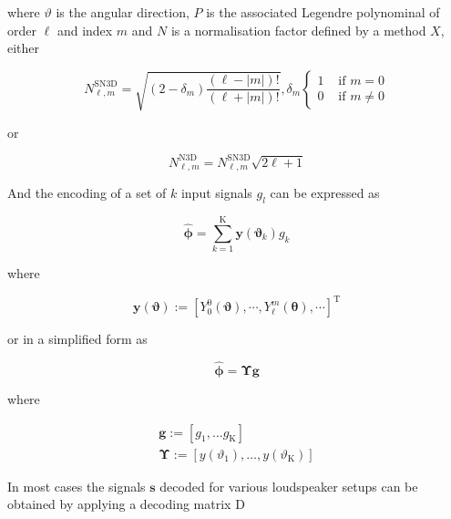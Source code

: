 \documentclass[a4paper, 10pt, twocolumn]{article}
\begin{document}
where $\vartheta$ is the angular direction, $P$ is the associated Legendre polynominal of order $\ell$ and index $m$ and $N$ is a normalisation factor defined by a method $X$, either

\begin{equation}\label{eq:sn3d}
N_{\ell, m}^{\mathrm{SN3D}}=\sqrt{\left(2-\delta_{m}\right) \frac{(\ell-|m|) !}{(\ell+|m|) !}}, \delta_{m}\left\{\begin{array}{ll}{1} & {\text { if } m=0} \\ {0} & {\text { if } m \neq 0}\end{array}\right.
\end{equation}

or 

\begin{equation}\label{eq:n3d}
N_{\ell, m}^{\mathrm{N3D}}=N_{\ell, m}^{\mathrm{SN3D}} \sqrt{2 \ell+1}
\end{equation}

And the encoding of a set of $k$ input signals $g_{l}$ can be expressed as

\begin{equation}
\hat{\boldsymbol{\phi}}=\sum_{k=1}^{\mathrm{K}} \boldsymbol{y}\left(\boldsymbol{\vartheta}_{k}\right) g_{k}
\end{equation}

where


\begin{equation*}
\boldsymbol{y}(\boldsymbol{\vartheta}) :=\left[Y_{0}^{0}(\boldsymbol{\vartheta}), \cdots, Y_{\ell}^{m}(\boldsymbol{\theta}), \cdots\right]^{\mathrm{T}}
\end{equation*}

or in a simplified form as

\begin{equation}
\hat{\boldsymbol{\phi}}=\boldsymbol{\Upsilon} \boldsymbol{g}
\end{equation}

where

\begin{equation*}
\begin{array}{l}{\boldsymbol{g} :=\left[g_{1}, \ldots g_{\mathrm{K}}\right]} \\ {\boldsymbol{\Upsilon} :=\left[y\left(\vartheta_{1}\right), \ldots, y\left(\vartheta_{\mathrm{K}}\right)\right]}\end{array}
\end{equation*}


In most cases the signals $\boldsymbol{s}$ decoded for various loudspeaker setups can be obtained by applying a decoding matrix D
\end{document}

